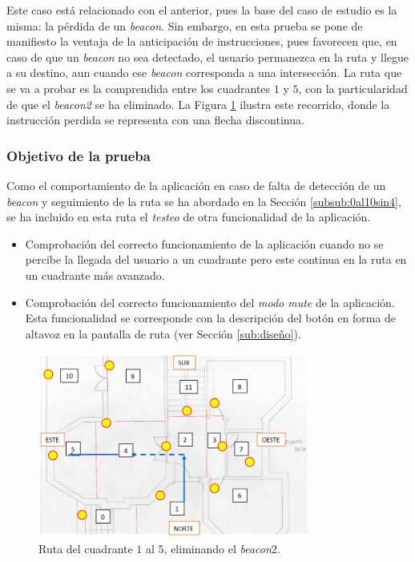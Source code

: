 Este caso está relacionado con el anterior, pues la base del caso de estudio es la misma: la pérdida de un \textit{beacon}. Sin embargo, en esta prueba se pone de manifiesto la ventaja de la anticipación de instrucciones, pues favorecen que, en caso de que un \textit{beacon} no sea detectado, el usuario permanezca en la ruta y llegue a su destino, aun cuando ese \textit{beacon} corresponda a una intersección. La ruta que se va a probar es la comprendida entre los cuadrantes $1$ y $5$, con la particularidad de que el \textit{beacon2} se ha eliminado. La Figura \ref{fig:del1al5sin2} ilustra este recorrido, donde la instrucción perdida se representa con una flecha discontinua.

\subsubsection*{Objetivo de la prueba}

Como el comportamiento de la aplicación en caso de falta de detección de un \textit{beacon} y seguimiento de la ruta se ha abordado en la Sección \ref{subsub:0al10sin4}, se ha incluido en esta ruta el \textit{testeo} de otra funcionalidad de la aplicación. 

\begin{itemize}
	\item Comprobación del correcto funcionamiento de la aplicación cuando no se percibe la llegada del usuario a un cuadrante pero este continua en la ruta en un cuadrante más avanzado.
	
	\item Comprobación del correcto funcionamiento del \textit{modo mute} de la aplicación. Esta funcionalidad se corresponde con la descripción del botón en forma de altavoz en la pantalla de ruta (ver Sección \ref{sub:diseño}). 
\end{itemize}

\begin{figure}[t]
	\centering
	\includegraphics[width=0.8\textwidth]{Imagenes/Evaluacion/del1al5sin2}
	\caption{Ruta del cuadrante $1$ al $5$, eliminando el \textit{beacon$2$}.}
	\label{fig:del1al5sin2}
\end{figure}

